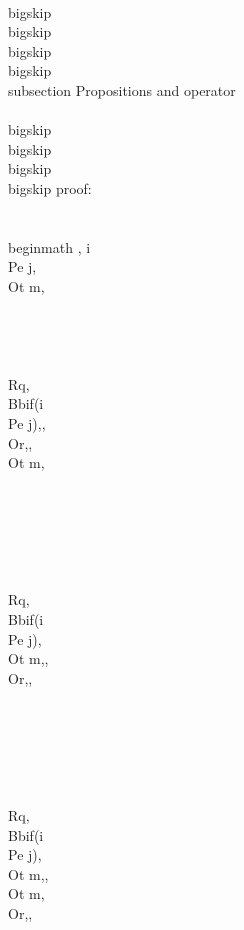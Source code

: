 \\bigskip
\\bigskip
\\bigskip
\\bigskip
\\subsection{ Propositions and operator}
\\[, i \\Pe j, \\Ot m, \\Rq , \\Ot m, i \\Pe j,\\]


\\bigskip
\\bigskip
\\bigskip
\\bigskip
proof:\\\\
\\begin{math} 
 , i \\Pe j, \\Ot m,\\\\\\\\
\\Rq, \\Bb{if(i \\Pe j)}{,}{,\\Or,}, \\Ot m, \\\\\\\\\\\\
\\Rq, \\Bb{if(i \\Pe j)}{, \\Ot m,}{,\\Or,}, \\\\\\\\\\\\
\\Rq, \\Bb{if(i \\Pe j)}{, \\Ot m,}{,\\Ot m, \\Or,}, \\\\\\\\\\\\
